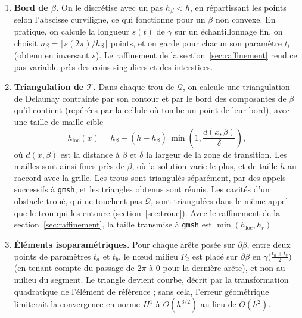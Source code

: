 \documentclass[11pt,a4paper]{article}
\begin{document}
\begin{enumerate}
        trou de la cellule non gardée qu'elle borde. Pour un obstacle connexe,
        il y a un seul trou. Les nœuds de ces contours sont imposés :
        ce sont exactement les nœuds de la grille. Chacune de ses arêtes est
        donc commune à un quadrilatère et à un triangle, et le maillage est
        conforme : sur cette arête, les traces $Q_2$ et $P_2$ sont toutes deux
        quadratiques et partagent les trois mêmes nœuds (deux sommets et le
        milieu).
  \item \textbf{Bord de $\beta$.} On le discrétise avec un pas $h_\beta < h$,
        en répartissant les points selon l'abscisse curviligne, ce qui
        fonctionne pour un $\beta$ non convexe. En pratique, on calcule
        la longueur $s(t)$ de $\gamma$ sur un échantillonnage fin, on
        choisit $n_\beta = \lceil s(2\pi)/h_\beta \rceil$ points, et on
        garde pour chacun son paramètre $t_i$ (obtenu en inversant $s$). Le
        raffinement de la section~\ref{sec:raffinement} rend ce pas variable
        près des coins singuliers et des interstices.
  \item \textbf{Triangulation de $\mathcal{T}$.} Dans chaque trou de
        $\mathcal{Q}$, on calcule une triangulation de Delaunay contrainte par
        son contour et par le bord des composantes de $\beta$ qu'il contient
        (repérées par la cellule où tombe un point de leur bord), avec une taille de
        maille cible
        \[
        h_{\mathrm{loc}}(x) = h_\beta + (h - h_\beta)\,\min\!\left(1, \frac{d(x,\beta)}{\delta}\right),
        \]
        où $d(x,\beta)$ est la distance à $\beta$ et $\delta$ la largeur de
        la zone de transition. Les mailles sont ainsi fines près de $\beta$,
        où la solution varie le plus, et de taille $h$ au raccord avec la
        grille. Les trous sont triangulés séparément, par des appels
        successifs à \texttt{gmsh}, et les triangles obtenus sont réunis.
        Les cavités d'un obstacle troué, qui ne touchent pas $\mathcal{Q}$,
        sont triangulées dans le même appel que le trou qui les entoure
        (section~\ref{sec:troue}).
        Avec le raffinement de la section~\ref{sec:raffinement}, la taille
        transmise à \texttt{gmsh} est $\min(h_{\mathrm{loc}}, h_r)$.
  \item \textbf{Éléments isoparamétriques.} Pour chaque arête posée sur
        $\partial\beta$, entre deux points de paramètres $t_a$ et $t_b$, le
        nœud milieu $P_2$ est placé sur $\partial\beta$ en
        $\gamma\big(\tfrac{t_a + t_b}{2}\big)$ (en tenant compte du passage
        de $2\pi$ à $0$ pour la dernière arête), et non au milieu du
        segment. Le triangle devient courbe, décrit par la
        transformation quadratique de l'élément de référence ; sans cela,
        l'erreur géométrique limiterait la convergence en norme $H^1$ à
        $O(h^{3/2})$ au lieu de $O(h^2)$.
\end{enumerate}
\end{document}

